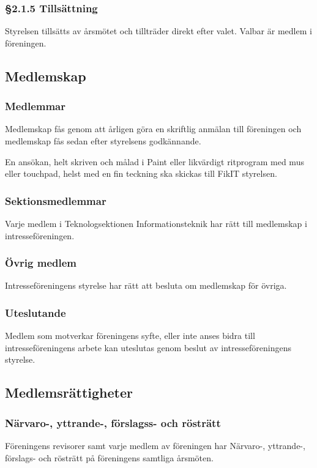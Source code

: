 \documentclass[11pt, noincludeaddress]{classes/cthit}
\begin{document}
\subsubsection{§2.1.5 Tillsättning}
Styrelsen tillsätts av årsmötet och tillträder direkt efter
valet. Valbar är medlem i föreningen.


\subsection{Medlemskap}

\subsubsection{Medlemmar}
Medlemskap fås genom att årligen göra en skriftlig anmälan till
föreningen och medlemskap fås sedan efter styrelsens godkännande.

En ansökan, helt skriven och målad i Paint eller likvärdigt ritprogram med mus eller touchpad, helst med en fin teckning ska skickas till FikIT styrelsen.

\subsubsection{Sektionsmedlemmar}
Varje medlem i Teknologsektionen Informationsteknik har rätt till medlemskap i intresseföreningen.

\subsubsection{Övrig medlem}
Intresseföreningens styrelse har rätt att besluta om medlemskap för övriga.

\subsubsection{Uteslutande}
Medlem som motverkar föreningens syfte, eller inte anses bidra till intresseföreningens arbete kan uteslutas genom beslut av intresseföreningens styrelse. 

\subsection{Medlemsrättigheter}

\subsubsection{Närvaro-, yttrande-, förslagss- och rösträtt}
Föreningens revisorer samt varje medlem av föreningen har Närvaro-,
yttrande-, förslags- och rösträtt på föreningens samtliga årsmöten.
\end{document}
